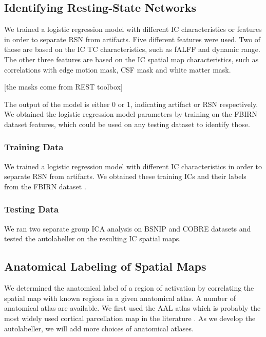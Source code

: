 \documentclass[letter]{article}
\begin{document}
\subsection{Identifying Resting-State Networks}

We trained a logistic regression model with different \ac{IC} characteristics or features in order to separate \ac{RSN} from artifacts.
Five different features were used.
Two of those are based on the \ac{IC} \ac{TC} characteristics, such as \ac{fALFF} and dynamic range.
The other three features are based on the \ac{IC} spatial map characteristics, such as correlations with edge motion mask, \ac{CSF} mask and white matter mask.

[the masks come from REST toolbox]

The output of the model is either 0 or 1, indicating artifact or \ac{RSN} respectively.
We obtained the logistic regression model parameters by training on the \ac{FBIRN} dataset features, which could be used on any testing dataset to identify those.

\subsubsection{Training Data}

We trained a logistic regression model with different \ac{IC} characteristics in order to separate \ac{RSN} from artifacts.
We obtained these training \acp{IC} and their labels from the \ac{FBIRN} dataset \cite{b1}.

\subsubsection{Testing Data}

We ran two separate group \ac{ICA} analysis on \ac{BSNIP} and \ac{COBRE} datasets and tested the autolabeller on the resulting \ac{IC} spatial maps.

\subsection{Anatomical Labeling of Spatial Maps}

We determined the anatomical label of a region of activation by correlating the spatial map with known regions in a given anatomical atlas.
A number of anatomical atlas are available.
We first used the \ac{AAL} atlas which is probably the most widely used cortical parcellation map in the literature \cite{b2}.
As we develop the autolabeller, we will add more choices of anatomical atlases.
\end{document}
